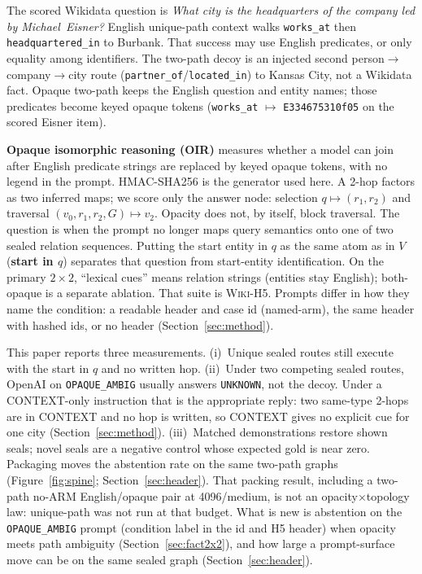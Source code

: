 \documentclass[10pt]{article} %
\begin{document}
The scored Wikidata question is \emph{What city is the headquarters of the
company led by \mbox{Michael Eisner}?}
English unique-path context walks \texttt{works\_at} then
\texttt{headquartered\_in} to Burbank. That success may use English
predicates, or only equality among identifiers.
The two-path decoy is an injected second person$\to$company$\to$city route
(\texttt{partner\_of}/\texttt{located\_in}) to Kansas City, not a Wikidata
fact.
Opaque two-path keeps the English question and entity names; those
predicates become keyed opaque tokens (\texttt{works\_at} $\mapsto$
\texttt{E334675310f05} on the scored Eisner item).

\textbf{Opaque isomorphic reasoning (OIR)} measures whether a model can
join after English predicate strings are replaced by keyed opaque tokens,
with no legend in the prompt.
HMAC-SHA256 is the generator used here.
A 2-hop factors as two inferred maps; we score only the answer node:
selection $q \mapsto (r_1,r_2)$ and traversal
$(v_0,r_1,r_2,G)\mapsto v_2$.
Opacity does not, by itself, block traversal.
The question is when the prompt no longer maps query semantics onto one of
two sealed relation sequences.
Putting the start entity in $q$ as the same atom as in $V$
(\textbf{start in $q$}) separates that question from start-entity
identification.
On the primary $2{\times}2$, ``lexical cues'' means relation strings
(entities stay English); both-opaque is a separate ablation.
That suite is \textsc{Wiki-H5}.
Prompts differ in how they name the condition: a readable header and case
id (named-arm), the same header with hashed ids, or no header
(Section~\ref{sec:method}).

This paper reports three measurements.
(i)~Unique sealed routes still execute with the start in $q$ and no written hop.
(ii)~Under two competing sealed routes, OpenAI on
\texttt{OPAQUE\_AMBIG} usually answers
\texttt{UNKNOWN}, not the decoy.
Under a CONTEXT-only instruction that is the appropriate reply: two
same-type 2-hops are in CONTEXT and no hop is written, so CONTEXT gives no
explicit cue for one city (Section~\ref{sec:method}).
(iii)~Matched demonstrations restore shown seals; novel seals are a
negative control whose expected gold is near zero.
Packaging moves the abstention rate on the same two-path graphs
(Figure~\ref{fig:spine}; Section~\ref{sec:header}).
That packing result, including a two-path no-ARM English/opaque pair at
4096/medium, is not an opacity$\times$topology law: unique-path was not
run at that budget.
What is new is abstention on the \texttt{OPAQUE\_AMBIG} prompt
(condition label in the id and H5 header) when opacity meets path ambiguity
(Section~\ref{sec:fact2x2}), and how large a prompt-surface move can be
on the same sealed graph (Section~\ref{sec:header}).
\end{document}
